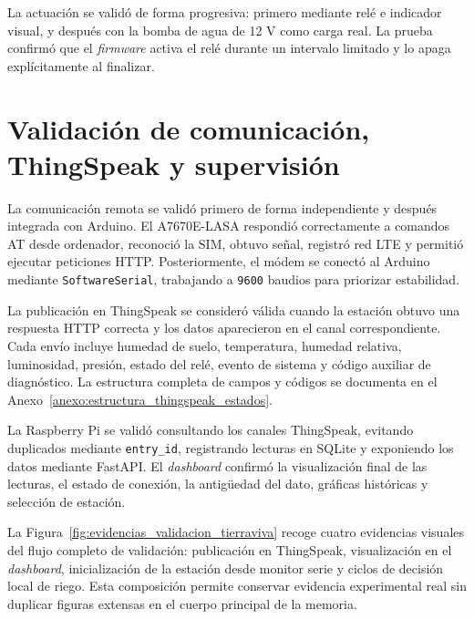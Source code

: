 La actuación se validó de forma progresiva: primero mediante relé e indicador visual, y después con la bomba de agua de 12 V como carga real. La prueba confirmó que el \textit{firmware} activa el relé durante un intervalo limitado y lo apaga explícitamente al finalizar.

\section{Validación de comunicación, ThingSpeak y supervisión}
\label{sec:validacion_comunicacion_supervision}

La comunicación remota se validó primero de forma independiente y después integrada con Arduino. El A7670E-LASA respondió correctamente a comandos AT desde ordenador, reconoció la SIM, obtuvo señal, registró red LTE y permitió ejecutar peticiones HTTP. Posteriormente, el módem se conectó al Arduino mediante \texttt{SoftwareSerial}, trabajando a \texttt{9600} baudios para priorizar estabilidad.

La publicación en ThingSpeak se consideró válida cuando la estación obtuvo una respuesta HTTP correcta y los datos aparecieron en el canal correspondiente. Cada envío incluye humedad de suelo, temperatura, humedad relativa, luminosidad, presión, estado del relé, evento de sistema y código auxiliar de diagnóstico. La estructura completa de campos y códigos se documenta en el Anexo~\ref{anexo:estructura_thingspeak_estados}.

La Raspberry Pi se validó consultando los canales ThingSpeak, evitando duplicados mediante \texttt{entry\_id}, registrando lecturas en SQLite y exponiendo los datos mediante FastAPI. El \textit{dashboard} confirmó la visualización final de las lecturas, el estado de conexión, la antigüedad del dato, gráficas históricas y selección de estación.

La Figura~\ref{fig:evidencias_validacion_tierraviva} recoge cuatro evidencias visuales del flujo completo de validación: publicación en ThingSpeak, visualización en el \textit{dashboard}, inicialización de la estación desde monitor serie y ciclos de decisión local de riego. Esta composición permite conservar evidencia experimental real sin duplicar figuras extensas en el cuerpo principal de la memoria.

